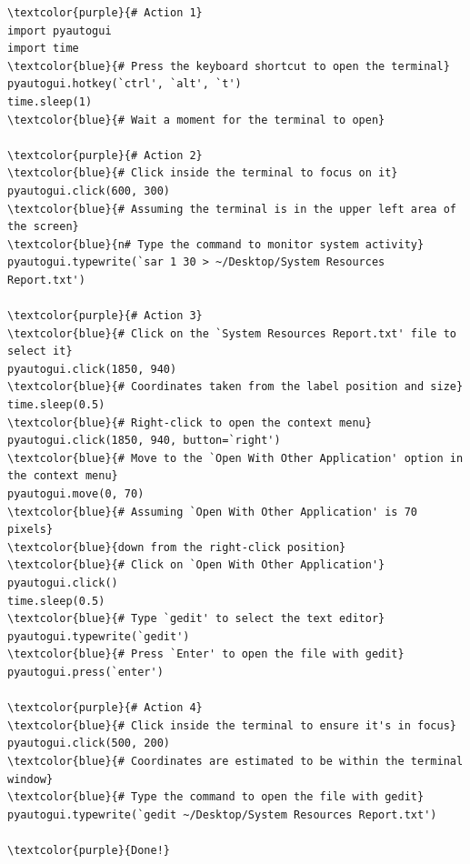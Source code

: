 \begin{tcolorbox}[title={Agent > Human Task: \textit{I want to understand the resource usage of my Ubuntu system under normal workloads. Please use the `sar` command in the `sysstat` toolkit to monitor system activity, evaluate the status once every second for 30 seconds, output the results to "System Resources Report.txt" under Desktop.}}]
\begin{Verbatim}[commandchars=\\\{\}]
\textcolor{purple}{# Action 1}
import pyautogui
import time
\textcolor{blue}{# Press the keyboard shortcut to open the terminal}
pyautogui.hotkey(`ctrl', `alt', `t')
time.sleep(1)  
\textcolor{blue}{# Wait a moment for the terminal to open}

\textcolor{purple}{# Action 2}
\textcolor{blue}{# Click inside the terminal to focus on it}
pyautogui.click(600, 300)  
\textcolor{blue}{# Assuming the terminal is in the upper left area of the screen}
\textcolor{blue}{n# Type the command to monitor system activity}
pyautogui.typewrite(`sar 1 30 > ~/Desktop/System Resources Report.txt')

\textcolor{purple}{# Action 3}
\textcolor{blue}{# Click on the `System Resources Report.txt' file to select it}
pyautogui.click(1850, 940)  
\textcolor{blue}{# Coordinates taken from the label position and size}
time.sleep(0.5)
\textcolor{blue}{# Right-click to open the context menu}
pyautogui.click(1850, 940, button=`right')
\textcolor{blue}{# Move to the `Open With Other Application' option in the context menu}
pyautogui.move(0, 70)  
\textcolor{blue}{# Assuming `Open With Other Application' is 70 pixels}
\textcolor{blue}{down from the right-click position}
\textcolor{blue}{# Click on `Open With Other Application'}
pyautogui.click()
time.sleep(0.5)
\textcolor{blue}{# Type `gedit' to select the text editor}
pyautogui.typewrite(`gedit')
\textcolor{blue}{# Press `Enter' to open the file with gedit}
pyautogui.press(`enter')

\textcolor{purple}{# Action 4}
\textcolor{blue}{# Click inside the terminal to ensure it's in focus}
pyautogui.click(500, 200)  
\textcolor{blue}{# Coordinates are estimated to be within the terminal window}
\textcolor{blue}{# Type the command to open the file with gedit}
pyautogui.typewrite(`gedit ~/Desktop/System Resources Report.txt')

\textcolor{purple}{Done!}
\end{Verbatim}
\end{tcolorbox}

